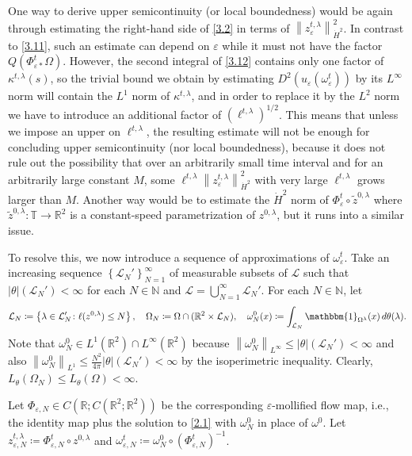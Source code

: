 \documentclass[reqno,centertags,12pt]{amsart}
\theoremstyle{definition}
\numberwithin{equation}{section}
\newcommand{\norm}[1]{\left\|#1\right\|}
\newcommand{\set}[1]{\left\{ #1 \right\}}
\newcommand{\bbN}{{\mathbb{N}}}
\newcommand{\bbR}{{\mathbb{R}}}
\newcommand{\bbT}{{\mathbb{T}}}
\newcommand{\eps}{\varepsilon}
\newcommand{\tht}{\theta}
\begin{document}
One way to derive upper semicontinuity (or local boundedness) would be
again through estimating the right-hand side of \eqref{3.2}
in terms of $\norm{z_{\eps}^{t,\lambda}}_{\dot{H}^{2}}^{2}$.
In contrast to \eqref{3.11}, such an estimate can depend on $\eps$
while it must not have the factor $Q(\Phi_{\eps*}^{t}\Omega)$.
However, the second integral of \eqref{3.12} contains only one factor of $\kappa^{t,\lambda}(s)$,
so the trivial bound we obtain by estimating $D^{2}(u_{\eps}(\omega_{\eps}^{t}))$
by its $L^{\infty}$ norm will contain the $L^{1}$ norm of $\kappa^{t,\lambda}$,
and in order to replace it by the $L^{2}$ norm we have to introduce
an additional factor of $(\ell^{t,\lambda})^{1/2}$.
This means that unless we impose an upper on $\ell^{t,\lambda}$, the resulting estimate
will not be enough for concluding upper semicontinuity (nor local boundedness),
because it does not rule out the possibility that
over an arbitrarily small time interval and for an arbitrarily large constant $M$,
some $\ell^{t,\lambda}\norm{z_{\eps}^{t,\lambda}}_{\dot{H}^{2}}^{2}$ with very large
$\ell^{t,\lambda}$ grows larger than $M$.
Another way would be to estimate the $\dot{H}^{2}$ norm of
$\Phi_{\eps}^{t}\circ\tilde{z}^{0,\lambda}$ where
$\tilde{z}^{0,\lambda}\colon\bbT\to\bbR^{2}$ is a constant-speed parametrization
of $z^{0,\lambda}$, but it runs into a similar issue.

To resolve this, we now introduce a sequence of approximations of $\omega_{\eps}^{t}$.
Take an increasing sequence $\set{\mathcal{L}_{N}'}_{N=1}^{\infty}$ of
measurable subsets of $\mathcal{L}$ such that $|\theta|(\mathcal{L}_{N}')<\infty$
for each $N\in\bbN$ and $\mathcal{L} = \bigcup_{N=1}^{\infty}\mathcal{L}_{N}'$.
For each $N\in\bbN$, let
\[
    \mathcal{L}_{N}\coloneqq \set{\lambda\in\mathcal{L}_{N}'\colon
    \ell(z^{0,\lambda}) \leq N},\quad
    \Omega_{N}\coloneqq \Omega\cap(\bbR^{2}\times\mathcal{L}_{N}),\quad
    \omega_{N}^{0}(x)\coloneqq
    \int_{\mathcal{L}_{N}}\mathbbm{1}_{\Omega^{\lambda}}(x)\,d\theta(\lambda).
\]
Note that $\omega_{N}^{0} \in L^{1}(\bbR^{2})\cap L^{\infty}(\bbR^{2})$ because
$\norm{\omega_{N}^{0}}_{L^{\infty}} \leq |\theta|(\mathcal{L}_{N}') <\infty$ and
also $\norm{\omega_{N}^{0}}_{L^{1}} \leq \frac{N^{2}}{4\pi}|\theta|(\mathcal{L}_{N}') < \infty$
by the isoperimetric inequality. Clearly, $L_{\tht}(\Omega_{N}) \leq L_{\tht}(\Omega) < \infty$.

Let $\Phi_{\eps,N}\in C\left(\bbR;C(\bbR^{2};\bbR^{2})\right)$ be the corresponding
$\eps$-mollified flow map, i.e., the identity map plus the solution to \eqref{2.1}
with $\omega_{N}^{0}$ in place of $\omega^{0}$.
Let $z_{\eps,N}^{t,\lambda}\coloneqq \Phi_{\eps,N}^{t}\circ z^{0,\lambda}$
and $\omega_{\eps,N}^{t} \coloneqq \omega_{N}^{0} \circ (\Phi_{\eps,N}^{t})^{-1}$.
\end{document}
